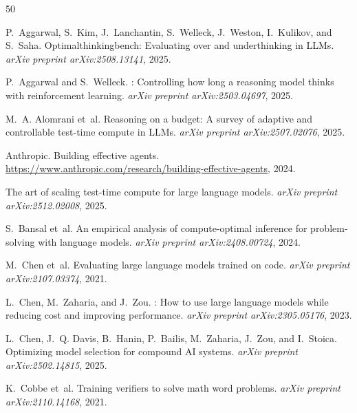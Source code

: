 \documentclass[11pt]{article}
\begin{document}
\begin{thebibliography}{50}

P.~Aggarwal, S.~Kim, J.~Lanchantin, S.~Welleck, J.~Weston, I.~Kulikov, and S.~Saha.
\newblock Optimalthinkingbench: Evaluating over and underthinking in {LLMs}.
\newblock \emph{arXiv preprint arXiv:2508.13141}, 2025.

P.~Aggarwal and S.~Welleck.
: Controlling how long a reasoning model thinks with reinforcement learning.
\newblock \emph{arXiv preprint arXiv:2503.04697}, 2025.

M.~A. Alomrani et~al.
\newblock Reasoning on a budget: A survey of adaptive and controllable test-time compute in {LLMs}.
\newblock \emph{arXiv preprint arXiv:2507.02076}, 2025.

Anthropic.
\newblock Building effective agents.
\newblock \url{https://www.anthropic.com/research/building-effective-agents}, 2024.

The art of scaling test-time compute for large language models.
\newblock \emph{arXiv preprint arXiv:2512.02008}, 2025.

S.~Bansal et~al.
\newblock An empirical analysis of compute-optimal inference for problem-solving with language models.
\newblock \emph{arXiv preprint arXiv:2408.00724}, 2024.

M.~Chen et~al.
\newblock Evaluating large language models trained on code.
\newblock \emph{arXiv preprint arXiv:2107.03374}, 2021.

L.~Chen, M.~Zaharia, and J.~Zou.
: How to use large language models while reducing cost and improving performance.
\newblock \emph{arXiv preprint arXiv:2305.05176}, 2023.

L.~Chen, J.~Q. Davis, B.~Hanin, P.~Bailis, M.~Zaharia, J.~Zou, and I.~Stoica.
\newblock Optimizing model selection for compound {AI} systems.
\newblock \emph{arXiv preprint arXiv:2502.14815}, 2025.

K.~Cobbe et~al.
\newblock Training verifiers to solve math word problems.
\newblock \emph{arXiv preprint arXiv:2110.14168}, 2021.


\end{thebibliography}
\end{document}

